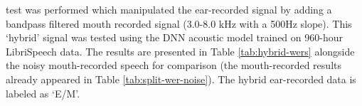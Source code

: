 {%
}%

\DIFdelend \DIFaddbegin {}\DIFaddend test was performed which manipulated the ear-recorded signal by adding a \DIFaddbegin {}\DIFaddend bandpass filtered mouth recorded signal (3.0-8.0 kHz with a 500Hz slope)\DIFdelbegin {}\DIFdelend .  This `hybrid' signal was tested using the \DIFdelbegin {}\DIFdelend \DIFaddbegin {}\DIFaddend DNN acoustic model trained on 960-hour LibriSpeech data.  The results are presented in Table \ref{tab:hybrid-wers} alongside the noisy mouth-recorded speech for comparison (the mouth-recorded results already appeared in Table \ref{tab:split-wer-noise}).  The hybrid ear-recorded data is labeled as `E/M'.

